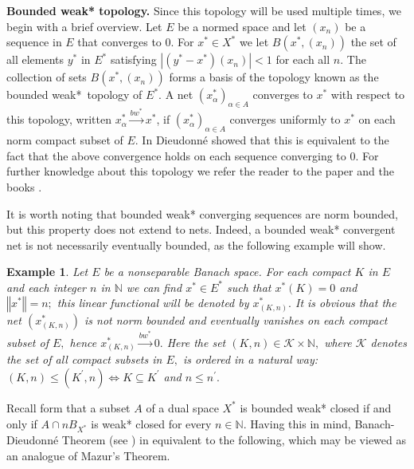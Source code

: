 \documentclass[12pt]{article}%
\newtheorem{example}[theorem]{Example}
\begin{document}
\textbf{Bounded weak* topology. }Since this topology will be used multiple
times, we begin with a brief overview. Let $E$ be a normed space and let
$(x_{n})$ be a sequence in $E$ that converges to $0.$ For $x^{\ast}\in
X^{\ast}$ we let $B(x^{\ast},(x_{n}))$ the set of all elements $y^{\ast}$ in
$E^{\ast}$ satisfying $\left\vert \left(  y^{\ast}-x^{\ast}\right)  \left(
x_{n}\right)  \right\vert <1$ for each all $n.$ The collection of sets
$B(x^{\ast},(x_{n}))$ forms a basis of the topology known as the bounded
weak*\ topology of $E^{\ast}.$ A net $(x_{\alpha}^{\ast})_{\alpha\in A}$
converges to $x^{\ast}$ with respect to this topology, written $x_{\alpha
}^{\ast}\overset{bw^{\ast}}{\longrightarrow}x^{\ast}$, if $\left(  x_{\alpha
}^{\ast}\right)  _{\alpha\in A}$ converges uniformly to $x^{\ast}$ on each
norm compact subset of $E.$ In \cite{a-2643} Dieudonn\'{e} showed that this is
equivalent to the fact that the above convergence holds on each sequence
converging to $0.$ For further knowledge about this topology we refer the
reader to the paper \cite{a-2643} and the books \cite{b-2554,b-1901}.

It is worth noting that bounded weak* converging sequences are norm bounded,
but this property does not extend to nets. Indeed, a bounded weak* convergent
net is not necessarily eventually bounded, as the following example will show.

\begin{example}
Let $E$ be a nonseparable Banach space. For each compact $K$ in $E$ and each
integer $n$ in $\mathbb{N}$ we can find $x^{\ast}\in E^{\ast}$ such that
$x^{\ast}\left(  K\right)  =0$ and $\left\Vert x^{\ast}\right\Vert =n;$ this
linear functional will be denoted by $x_{\left(  K,n\right)  }^{\ast}.$ It is
obvious that the net $\left(  x_{\left(  K,n\right)  }^{\ast}\right)  $ is not
norm bounded and eventually vanishes on each compact subset of $E,$ hence
$x_{\left(  K,n\right)  }^{\ast}\overset{bw^{\ast}}{\longrightarrow}0.$ Here
the set $\left(  K,n\right)  \in\mathcal{K}\times\mathbb{N},$ where
$\mathcal{K}$ denotes the set of all compact subsets in $E,$ is ordered in a
natural way: $\left(  K,n\right)  \leq\left(  K^{\prime},n\right)
\Leftrightarrow K\subseteq K^{\prime}$ and $n\leq n^{\prime}.$
\end{example}

Recall form \cite[Corollary 2.5.7]{b-2554} that a subset $A$ of a dual space
$X^{\ast}$ is bounded weak* closed if and only if $A\cap nB_{X^{\ast}}$ is
weak* closed for every $n\in\mathbb{N}.$ Having this in mind,
Banach-Dieudonn\'{e} Theorem (see \cite[Theorem 3.92]{b-1417}) in equivalent
to the following, which may be viewed as an analogue of Mazur's Theorem.
\end{document}
